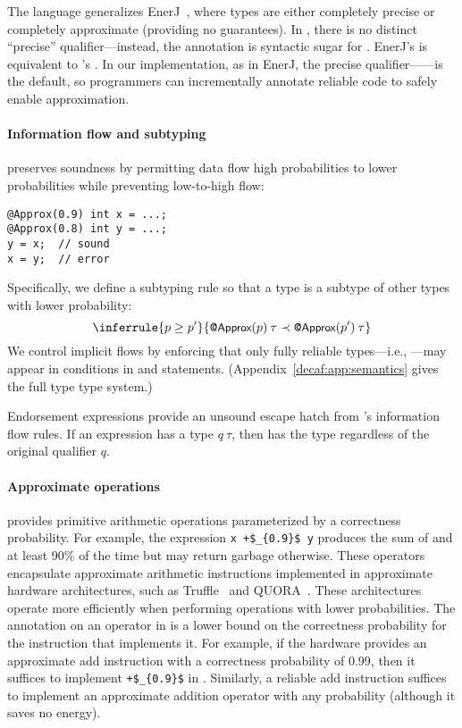 The language generalizes EnerJ~\cite{enerj}, where types are either
completely precise or completely approximate (providing no guarantees).
In \lang, there is no distinct ``precise'' qualifier---instead, the
 annotation is syntactic sugar for .
EnerJ's  is equivalent to \lang's .
In our implementation, as in EnerJ, the precise
qualifier------is the default, so programmers can
incrementally annotate reliable code to safely enable approximation.

\paragraph{Information flow and subtyping}
\lang preserves soundness by permitting data flow high probabilities
to lower probabilities while preventing low-to-high flow:
%
\begin{lstlisting}
@Approx(0.9) int x = ...;
@Approx(0.8) int y = ...;
y = x;  // sound
x = y;  // error
\end{lstlisting}
%
Specifically, we define a subtyping rule so that a type is a subtype of
other types with lower probability:
%
\[
    \inferrule
        {p \geq p'}
        {\ApproxN{p} \> \tau
         \prec \ApproxN{p'} \> \tau}
\]
%
We control implicit flows by enforcing that only fully reliable types---i.e.,
---may appear in conditions in  and
 statements.
(Appendix~\ref{decaf:app:semantics} gives the full type type system.)

Endorsement expressions provide an unsound escape hatch from \lang's
information flow rules.
If an expression  has a type $q \> \tau$, then 
has the type  regardless of the original qualifier
$q$.


\paragraph{Approximate operations}
\lang provides primitive arithmetic operations parameterized by a correctness
probability.
For example, the expression \lstinline!x +$_{0.9}$ y! produces the sum of 
and  at least 90\% of the time but may return garbage otherwise.
These operators encapsulate approximate arithmetic instructions implemented in
approximate hardware architectures, such as Truffle~\cite{truffle} and
QUORA~\cite{quora}.
These architectures operate more efficiently when performing operations with
lower probabilities.
The annotation on an operator in \lang is a lower bound on the
correctness probability for the instruction that implements it.
For example, if the hardware provides an approximate add instruction
with a correctness probability of 0.99, then it suffices to implement
\lstinline!+$_{0.9}$! in \lang.
Similarly, a reliable add instruction suffices to implement an approximate
addition operator with any probability (although it saves no energy).

